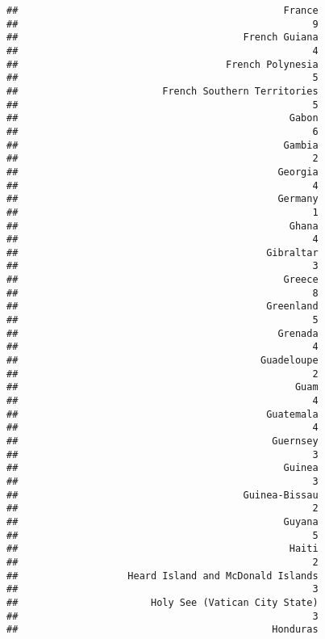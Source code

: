\documentclass[
]{article}
\begin{document}
\begin{verbatim}
##                                              France 
##                                                   9 
##                                       French Guiana 
##                                                   4 
##                                    French Polynesia 
##                                                   5 
##                         French Southern Territories 
##                                                   5 
##                                               Gabon 
##                                                   6 
##                                              Gambia 
##                                                   2 
##                                             Georgia 
##                                                   4 
##                                             Germany 
##                                                   1 
##                                               Ghana 
##                                                   4 
##                                           Gibraltar 
##                                                   3 
##                                              Greece 
##                                                   8 
##                                           Greenland 
##                                                   5 
##                                             Grenada 
##                                                   4 
##                                          Guadeloupe 
##                                                   2 
##                                                Guam 
##                                                   4 
##                                           Guatemala 
##                                                   4 
##                                            Guernsey 
##                                                   3 
##                                              Guinea 
##                                                   3 
##                                       Guinea-Bissau 
##                                                   2 
##                                              Guyana 
##                                                   5 
##                                               Haiti 
##                                                   2 
##                   Heard Island and McDonald Islands 
##                                                   3 
##                       Holy See (Vatican City State) 
##                                                   3 
##                                            Honduras 

\end{verbatim}
\end{document}
